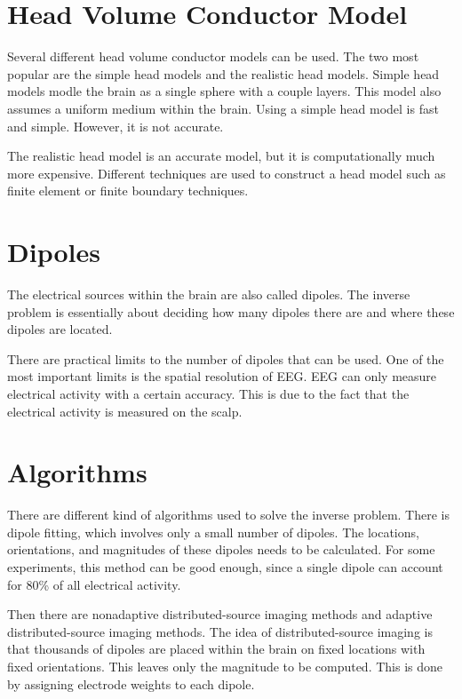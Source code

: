 \section{Head Volume Conductor Model}

Several different head volume conductor models can be used. The two most popular are the simple head models and the realistic head models. Simple head models modle the brain as a single sphere with a couple layers. This model also assumes a uniform medium within the brain. Using a simple head model is fast and simple. However, it is not accurate. 

The realistic head model is an accurate model, but it is computationally much more expensive. Different techniques are used to construct a head model such as finite element or finite boundary techniques. 

\section{Dipoles}

The electrical sources within the brain are also called dipoles. The inverse problem is essentially about deciding how many dipoles there are and where these dipoles are located. 

There are practical limits to the number of dipoles that can be used. One of the most important limits is the spatial resolution of EEG. EEG can only measure electrical activity with a certain accuracy. This is due to the fact that the electrical activity is measured on the scalp. 

\section{Algorithms}

There are different kind of algorithms used to solve the inverse problem. There is dipole fitting, which involves only a small number of dipoles. The locations, orientations, and magnitudes of these dipoles needs to be calculated. For some experiments, this method can be good enough, since a single dipole can account for 80\% of all electrical activity.

Then there are nonadaptive distributed-source imaging methods and adaptive distributed-source imaging methods. The idea of distributed-source imaging is that thousands of dipoles are placed within the brain on fixed locations with fixed orientations. This leaves only the magnitude to be computed. This is done by assigning electrode weights to each dipole.

